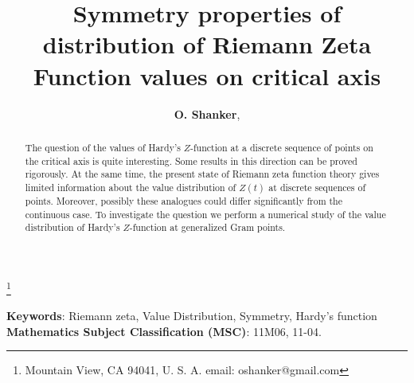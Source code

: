 \documentclass[twoside]{article}
\begin{document}


\newtheorem{theorem}{Theorem}[section]
\newtheorem{lemma}[theorem]{Lemma}

\theoremstyle{definition}
\newtheorem{definition}[theorem]{Definition}
\newtheorem{example}[theorem]{Example}
\newtheorem{xca}[theorem]{Exercise}

\theoremstyle{remark}
\newtheorem{remark}[theorem]{Remark}



\date{}
\lhead[]{}
\rhead[]{}

\title{\bf{Symmetry properties of distribution of Riemann Zeta Function values on critical axis}}

\maketitle


\author{{\textbf{O. Shanker}},}
\thanks{ Mountain View, CA 94041, U. S. A. email: oshanker@gmail.com}

\thispagestyle{fancy}

\begin{abstract}
The question of the values of Hardy's $Z$-function at a discrete sequence of points on the critical axis is quite interesting. Some results in this direction can be proved rigorously. At the same time, the present state of Riemann zeta function theory gives limited information about the value distribution of $Z(t)$ at discrete sequences of points. Moreover, possibly these analogues could differ significantly from the continuous case. To investigate the question we perform a numerical study of the value distribution of Hardy's $Z$-function at generalized Gram points. 

\end{abstract}
{\textbf {Keywords}:} Riemann zeta, Value Distribution, Symmetry, Hardy's function
{\textbf {Mathematics Subject Classification (MSC)}:} 11M06, 11-04.
\end{document}
